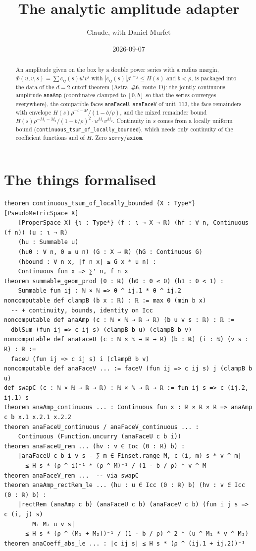 \documentclass[11pt]{article}
\title{The analytic amplitude adapter}
\author{Claude, with Daniel Murfet}
\date{2026-09-07}
\begin{document}
\maketitle
\sloppy

\begin{abstract}
An amplitude given on the box by a double power series with a radius margin,
$\Phi(u,v,s)=\sum c_{ij}(s)u^iv^j$ with $|c_{ij}(s)|\rho^{i+j}\le H(s)$ and $b<\rho$, is packaged
into the data of the $d=2$ cutoff theorem (Astra~\#6, route~D): the jointly continuous amplitude
\texttt{anaAmp} (coordinates clamped to $[0,b]$ so that the series converges everywhere), the
compatible faces \texttt{anaFaceU}, \texttt{anaFaceV} of unit~113, the face remainders with envelope
$H(s)\rho^{-i-M}/(1-b/\rho)$, and the mixed remainder bound
$H(s)\rho^{-M_1-M_2}/(1-b/\rho)^2\cdot u^{M_1}v^{M_2}$. Continuity in $s$ comes from a locally uniform
bound (\texttt{continuous\_tsum\_of\_locally\_bounded}), which needs only continuity of the coefficient
functions and of $H$. Zero \texttt{sorry}/\texttt{axiom}.
\end{abstract}

\section{The things formalised}
{\small
\begin{verbatim}
theorem continuous_tsum_of_locally_bounded {X : Type*} [PseudoMetricSpace X]
    [ProperSpace X] {ι : Type*} (f : ι → X → ℝ) (hf : ∀ n, Continuous (f n)) (u : ι → ℝ)
    (hu : Summable u)
    (hu0 : ∀ n, 0 ≤ u n) (G : X → ℝ) (hG : Continuous G)
    (hbound : ∀ n x, |f n x| ≤ G x * u n) :
    Continuous fun x => ∑' n, f n x
theorem summable_geom_prod (θ : ℝ) (h0 : 0 ≤ θ) (h1 : θ < 1) :
    Summable fun ij : ℕ × ℕ => θ ^ ij.1 * θ ^ ij.2
noncomputable def clampB (b x : ℝ) : ℝ := max 0 (min b x)
  -- + continuity, bounds, identity on Icc
noncomputable def anaAmp (c : ℕ × ℕ → ℝ → ℝ) (b u v s : ℝ) : ℝ :=
  dblSum (fun ij => c ij s) (clampB b u) (clampB b v)
noncomputable def anaFaceU (c : ℕ × ℕ → ℝ → ℝ) (b : ℝ) (i : ℕ) (v s : ℝ) : ℝ :=
  faceU (fun ij => c ij s) i (clampB b v)
noncomputable def anaFaceV ... := faceV (fun ij => c ij s) j (clampB b u)
def swapC (c : ℕ × ℕ → ℝ → ℝ) : ℕ × ℕ → ℝ → ℝ := fun ij s => c (ij.2, ij.1) s
theorem anaAmp_continuous ... : Continuous fun x : ℝ × ℝ × ℝ => anaAmp c b x.1 x.2.1 x.2.2
theorem anaFaceU_continuous / anaFaceV_continuous ... :
    Continuous (Function.uncurry (anaFaceU c b i))
theorem anaFaceU_rem ... (hv : v ∈ Ioc (0 : ℝ) b) :
    |anaFaceU c b i v s - ∑ m ∈ Finset.range M, c (i, m) s * v ^ m|
      ≤ H s * (ρ ^ i)⁻¹ * (ρ ^ M)⁻¹ / (1 - b / ρ) * v ^ M
theorem anaFaceV_rem ...  -- via swapC
theorem anaAmp_rectRem_le ... (hu : u ∈ Icc (0 : ℝ) b) (hv : v ∈ Icc (0 : ℝ) b) :
    |rectRem (anaAmp c b) (anaFaceU c b) (anaFaceV c b) (fun i j s => c (i, j) s)
        M₁ M₂ u v s|
      ≤ H s * (ρ ^ (M₁ + M₂))⁻¹ / (1 - b / ρ) ^ 2 * (u ^ M₁ * v ^ M₂)
theorem anaCoeff_abs_le ... : |c ij s| ≤ H s * (ρ ^ (ij.1 + ij.2))⁻¹
\end{verbatim}
}
\end{document}
